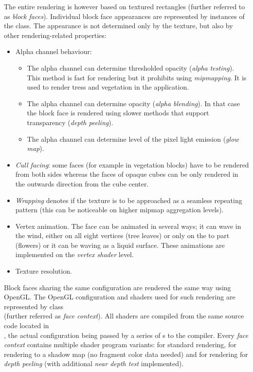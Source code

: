 The entire rendering is however based on textured rectangles (further referred to as \textit{block faces}). Individual block face appearances are represented by instances of the  class. The appearance is not determined only by the texture, but also by other rendering-related properties:
\begin{itemize}
	\item Alpha channel behaviour:
	\begin{itemize}
		\item The alpha channel can determine thresholded opacity (\textit{alpha testing}). This method is fast for rendering but it prohibits using \textit{mipmapping}. It is used to render tress and vegetation in the application.
		\item The alpha channel can determine opacity (\textit{alpha blending}). In that case the block face is rendered using slower methods that support transparency (\textit{depth peeling}).
		\item The alpha channel can determine level of the pixel light emission (\textit{glow map}).
	\end{itemize}
	\item \textit{Cull facing}: some faces (for example in vegetation blocks) have to be rendered from both sides whereas the faces of opaque cubes can be only rendered in the outwards direction from the cube center.
	\item \textit{Wrapping} denotes if the texture is to be approached as a seamless repeating pattern (this can be noticeable on higher mipmap aggregation levels).
	\item Vertex animation. The face can be animated in several ways; it can wave in the wind, either on all eight vertices (tree leaves) or only on the to part (flowers) or it can be waving as a liquid surface. These animations are implemented on the \textit{vertex shader} level.
	\item Texture resolution.
\end{itemize}

Block faces sharing the same configuration are rendered the same way using OpenGL. The OpenGL configuration and shaders used for such rendering are represented by class \\ (further referred as \textit{face context}). All shaders are compiled from the same source code located in \\, the actual configuration being passed by a series of s to the compiler. Every \textit{face context} contains multiple shader program variants: for standard rendering, for rendering to a shadow map (no fragment color data needed) and for rendering for \textit{depth peeling} (with additional \textit{near depth test} implemented).

